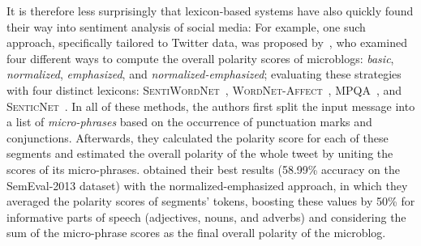 
It is therefore less surprisingly that lexicon-based systems have also
quickly found their way into sentiment analysis of social media: For
example, one such approach, specifically tailored to Twitter data, was
proposed by~\citet{Musto:14}, who examined four different ways to
compute the overall polarity scores of microblogs: \emph{basic},
\emph{normalized}, \emph{emphasized}, and
\emph{normalized-emphasized}; evaluating these strategies with four
distinct lexicons: \textsc{Sen\-ti\-Word\-Net}~\cite{Esuli:06c},
\textsc{Word\-Net-\-Affect}~\cite{Strapparava:04},
\textsc{MPQA}~\cite{Wiebe:05}, and
\textsc{SenticNet}~\cite{Cambria:14}.  In all of these methods, the
authors first split the input message into a list of
\emph{micro-phrases} based on the occurrence of punctuation marks and
conjunctions.  Afterwards, they calculated the polarity score for each
of these segments and estimated the overall polarity of the whole
tweet by uniting the scores of its micro-phrases.
\citeauthor{Musto:14} obtained their best results (58.99\% accuracy on
the SemEval-2013 dataset) with the normalized-emphasized approach, in
which they averaged the polarity scores of segments' tokens, boosting
these values by 50\% for informative parts of speech (adjectives,
nouns, and adverbs) and considering the sum of the micro-phrase scores
as the final overall polarity of the microblog.


